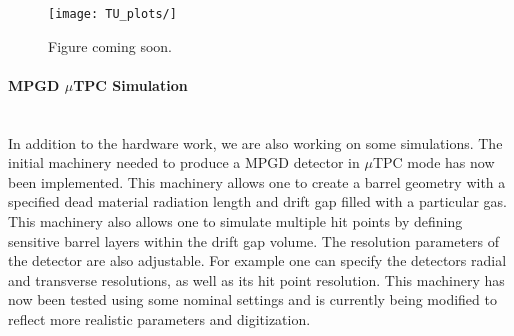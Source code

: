 \begin{figure}
\center
\texttt{[image: TU\_plots/]}
\caption{Figure coming soon.}
\label{fig:EICGFTcosmic}
\end{figure}
\paragraph*{MPGD $\mu$TPC Simulation}\mbox{}\\
In addition to the hardware work, we are also working on some simulations. The initial machinery needed to produce a MPGD detector in $\mu$TPC mode has now been implemented. This machinery allows one to create a barrel geometry with a specified dead material radiation length and drift gap filled with a particular gas. This machinery also allows one to simulate multiple hit points by defining sensitive barrel layers within the drift gap volume. The resolution parameters of the detector are also adjustable. For example one can specify the detectors radial and transverse resolutions, as well as its hit point resolution. This machinery has now been tested using some nominal settings and is currently being modified to reflect more realistic parameters and digitization.